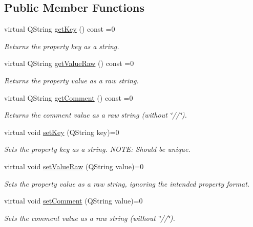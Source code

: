 \subsection*{Public Member Functions}
\begin{DoxyCompactItemize}
\item 
virtual Q\-String \hyperlink{class_i_base_property_acbec936e956aa7fe59737af25e8b1962}{get\-Key} () const =0
\begin{DoxyCompactList}\small\item\em Returns the property key as a string. \end{DoxyCompactList}\item 
virtual Q\-String \hyperlink{class_i_base_property_adf7edb55057975980bac6b6fc5514d15}{get\-Value\-Raw} () const =0
\begin{DoxyCompactList}\small\item\em Returns the property value as a raw string. \end{DoxyCompactList}\item 
virtual Q\-String \hyperlink{class_i_base_property_a53f9fd81c8247dfce1ac651576dd4119}{get\-Comment} () const =0
\begin{DoxyCompactList}\small\item\em Returns the comment value as a raw string (without \char`\"{}//\char`\"{}). \end{DoxyCompactList}\item 
virtual void \hyperlink{class_i_base_property_ad30bd2bc99dee7717390adccb8156c9b}{set\-Key} (Q\-String key)=0
\begin{DoxyCompactList}\small\item\em Sets the property key as a string. N\-O\-T\-E\-: Should be unique. \end{DoxyCompactList}\item 
virtual void \hyperlink{class_i_base_property_a39895fa933cddf290aeab127ba9aaa94}{set\-Value\-Raw} (Q\-String value)=0
\begin{DoxyCompactList}\small\item\em Sets the property value as a raw string, ignoring the intended property format. \end{DoxyCompactList}\item 
virtual void \hyperlink{class_i_base_property_ac749532ada813980bcb0a2f74ec45460}{set\-Comment} (Q\-String value)=0
\begin{DoxyCompactList}\small\item\em Sets the comment value as a raw string (without \char`\"{}//\char`\"{}). \end{DoxyCompactList}\end{DoxyCompactItemize}


